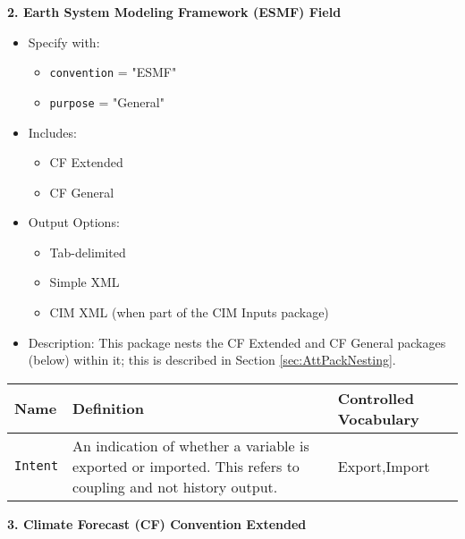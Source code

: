 \vspace{.20in}

{\bf 2. Earth System Modeling Framework (ESMF) Field}

\begin{itemize}
    \item Specify with:
    \begin{itemize}
        \item {\tt convention} = "ESMF"
        \item {\tt purpose} = "General"
    \end{itemize}
    \item Includes:
    \begin{itemize}
        \item CF Extended
        \item CF General
    \end{itemize}
    \item Output Options:
    \begin{itemize}
        \item Tab-delimited
        \item Simple XML
        \item CIM XML (when part of the CIM Inputs package)
    \end{itemize}
    \item Description: This package nests the CF Extended and CF General packages (below) within it; this is described in Section \ref{sec:AttPackNesting}.
\end{itemize}

\begin{tabular}{|p{5cm}|p{5cm}|p{35mm}|}
     \hline\hline
     {\bf Name } & {\bf Definition} & {\bf Controlled Vocabulary} \\
     \hline\hline
     {\tt Intent} & An indication of whether a variable is exported or imported. This refers to coupling and not history output. & Export,Import\\
     \hline\hline
\end{tabular}

\vspace{.20in}

{\bf 3. Climate Forecast (CF) Convention Extended}


